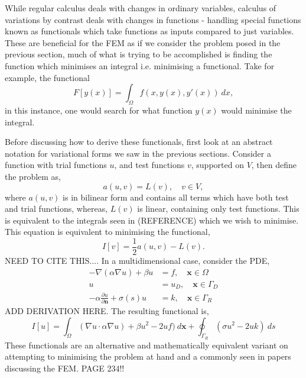 While regular calculus deals with changes in ordinary variables, calculus of variations by contrast deals with changes in functions - handling special functions  known as functionals which take functions as inputs compared to just variables. These are beneficial for the FEM as if we consider the problem posed in the previous section, much of what is trying to be accomplished is finding the function which minimises an integral i.e. minimising a functional. Take for example, the functional 
\begin{equation}
	F[y(x)] = \int_\Omega f(x, y(x),y'(x))~dx,
\end{equation}
in this instance, one would search for what function $y(x)$ would minimise the integral.


Before discussing how to derive these functionals, first look at an abstract notation for variational forms we saw in the previous sections. Consider a function with trial functions $u$, and test functions $v$, supported on $V$, then define the problem as,
\begin{equation}
	a(u,v) = L(v),\quad v\in V,
\end{equation}
where $a(u,v)$ is in bilinear form and contains all terms which have both test and trial functions, whereas, $L(v)$ is linear, containing only test functions. This is equivalent to the integrals seen in (REFERENCE) which we wish to minimise. This equation is equivalent to minimising the functional,
\begin{equation}
	I[v] = \frac{1}{2}a(u,v) - L(v). 
\end{equation}
NEED TO CITE THIS....
In a multidimensional case, consider the PDE,
\begin{align}
	-\nabla(\alpha\nabla u) + \beta u &= f,\quad \mathbf{x} \in \Omega\\
	u &= u_D,\quad \mathbf{x} \in \Gamma_D\\
	-\alpha \frac{\partial u}{\partial \mathbf{n}} + \sigma(s) u &= k,\quad \mathbf{x}\in \Gamma_R	
\end{align}
ADD DERIVATION HERE.
The resulting functional is,
\begin{equation}
	I[u] = \int_\Omega (\nabla u\cdot \alpha \nabla u) + \beta u^2 - 2 u f)~d\mathbf{x} + \oint_{\Gamma_R} (\sigma u^2 - 2 u k)~ds
\end{equation}
These functionals are an alternative and mathematically equivalent variant on attempting to minimising the problem at hand and a commonly seen in papers discussing the FEM. 
PAGE 234!!

